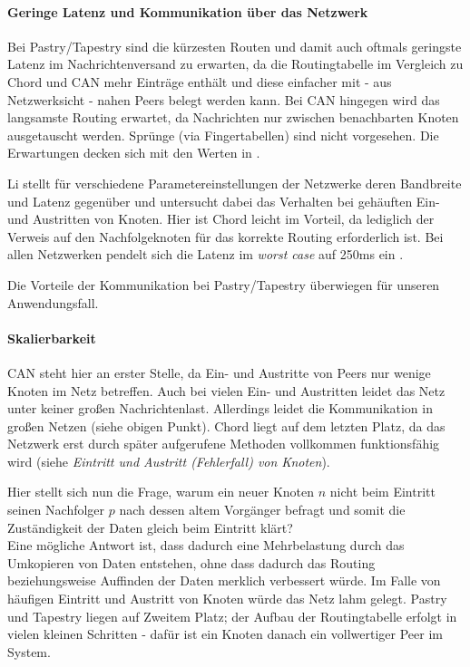 \paragraph{Geringe Latenz und Kommunikation über das Netzwerk}
Bei Pastry/Tapestry sind die kürzesten Routen und damit auch oftmals geringste Latenz im Nachrichtenversand zu erwarten, da die Routingtabelle im Vergleich zu Chord und CAN mehr Einträge enthält und diese einfacher mit - aus Netzwerksicht - nahen Peers belegt werden kann. Bei CAN hingegen wird das langsamste Routing erwartet, da Nachrichten nur zwischen benachbarten Knoten ausgetauscht werden. Sprünge (via Fingertabellen) sind nicht vorgesehen. Die Erwartungen decken sich mit den Werten in .

Li stellt für verschiedene Parametereinstellungen der Netzwerke deren Bandbreite und Latenz gegenüber und untersucht dabei das Verhalten bei gehäuften Ein- und Austritten von Knoten. Hier ist Chord leicht im Vorteil, da lediglich der Verweis auf den Nachfolgeknoten für das korrekte Routing erforderlich ist. Bei allen Netzwerken pendelt sich die Latenz im \emph{worst case} auf 250ms ein \cite{Li2004Comparing}.

Die Vorteile der Kommunikation bei Pastry/Tapestry überwiegen für unseren Anwendungsfall.

\paragraph{Skalierbarkeit}
CAN steht hier an erster Stelle, da Ein- und Austritte von Peers nur wenige Knoten im Netz betreffen. Auch bei vielen Ein- und Austritten leidet das Netz unter keiner großen Nachrichtenlast. Allerdings leidet die Kommunikation in großen Netzen (siehe obigen Punkt). Chord liegt auf dem letzten Platz, da das Netzwerk erst durch später aufgerufene Methoden vollkommen funktionsfähig wird (siehe \emph{Eintritt und Austritt (Fehlerfall) von Knoten}).

Hier stellt sich nun die Frage, warum ein neuer Knoten $n$ nicht beim Eintritt seinen Nachfolger $p$ nach dessen altem Vorgänger befragt und somit die Zuständigkeit der Daten gleich beim Eintritt klärt?\\
Eine mögliche Antwort ist, dass dadurch eine Mehrbelastung durch das Umkopieren von Daten entstehen, ohne dass dadurch das Routing beziehungsweise Auffinden der Daten merklich verbessert würde. Im Falle von häufigen Eintritt und Austritt von Knoten würde das Netz lahm gelegt. Pastry und Tapestry liegen auf Zweitem Platz; der Aufbau der Routingtabelle erfolgt in vielen kleinen Schritten - dafür ist ein Knoten danach ein vollwertiger Peer im System.

